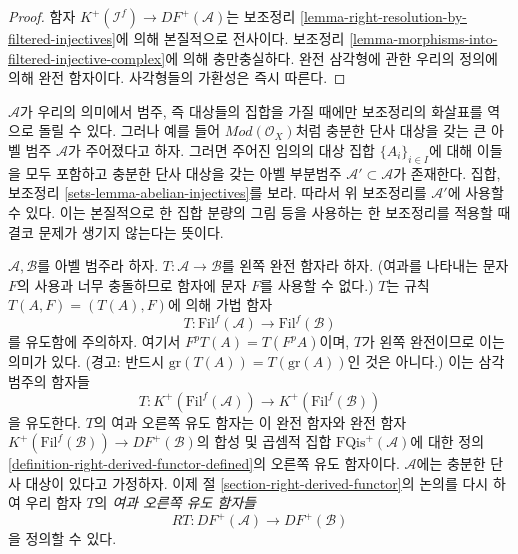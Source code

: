 \begin{proof}
함자 $K^{+}(\mathcal{I}^f) \to DF^{+}(\mathcal{A})$는 보조정리
\ref{lemma-right-resolution-by-filtered-injectives}에 의해 본질적으로
전사이다. 보조정리
\ref{lemma-morphisms-into-filtered-injective-complex}에 의해
충만충실하다. 완전 삼각형에 관한 우리의 정의에 의해 완전 함자이다.
사각형들의 가환성은 즉시 따른다.
\end{proof}

\begin{remark}
\label{remark-filtered-localization-big}
$\mathcal{A}$가 우리의 의미에서 범주, 즉 대상들의 집합을 가질 때에만
보조정리의 화살표를 역으로 돌릴 수 있다. 그러나 예를 들어
$\textit{Mod}(\mathcal{O}_X)$처럼 충분한 단사 대상을 갖는 큰 아벨 범주
$\mathcal{A}$가 주어졌다고 하자. 그러면 주어진 임의의 대상 집합
$\{A_i\}_{i\in I}$에 대해 이들을 모두 포함하고 충분한 단사 대상을
갖는 아벨 부분범주 $\mathcal{A}' \subset \mathcal{A}$가 존재한다.
집합, 보조정리 \ref{sets-lemma-abelian-injectives}를 보라. 따라서 위
보조정리를 $\mathcal{A}'$에 사용할 수 있다. 이는 본질적으로 한 집합
분량의 그림 등을 사용하는 한 보조정리를 적용할 때 결코 문제가
생기지 않는다는 뜻이다.
\end{remark}

\noindent
$\mathcal{A}, \mathcal{B}$를 아벨 범주라 하자.
$T : \mathcal{A} \to \mathcal{B}$를 왼쪽 완전 함자라 하자.
(여과를 나타내는 문자 $F$의 사용과 너무 충돌하므로 함자에 문자
$F$를 사용할 수 없다.) $T$는 규칙
$T(A, F) = (T(A), F)$에 의해 가법 함자
$$
T : \text{Fil}^f(\mathcal{A}) \to \text{Fil}^f(\mathcal{B})
$$
를 유도함에 주의하자. 여기서 $F^pT(A) = T(F^pA)$이며, $T$가 왼쪽
완전이므로 이는 의미가 있다. (경고: 반드시
$\text{gr}(T(A)) = T(\text{gr}(A))$인 것은 아니다.) 이는 삼각 범주의
함자들
\begin{equation}
\label{equation-induced-T-filtered}
T :
K^{+}(\text{Fil}^f(\mathcal{A}))
\longrightarrow
K^{+}(\text{Fil}^f(\mathcal{B}))
\end{equation}
을 유도한다. $T$의 여과 오른쪽 유도 함자는 이 완전 함자와 완전 함자
$K^{+}(\text{Fil}^f(\mathcal{B})) \to DF^{+}(\mathcal{B})$의 합성 및
곱셈적 집합 $\text{FQis}^{+}(\mathcal{A})$에 대한 정의
\ref{definition-right-derived-functor-defined}의 오른쪽 유도 함자이다.
$\mathcal{A}$에는 충분한 단사 대상이 있다고 가정하자. 이제 절
\ref{section-right-derived-functor}의 논의를 다시 하여 우리 함자 $T$의
{\it 여과 오른쪽 유도 함자들}
\begin{equation}
\label{equation-filtered-derived-functor}
RT : DF^{+}(\mathcal{A}) \longrightarrow DF^{+}(\mathcal{B})
\end{equation}
을 정의할 수 있다.

